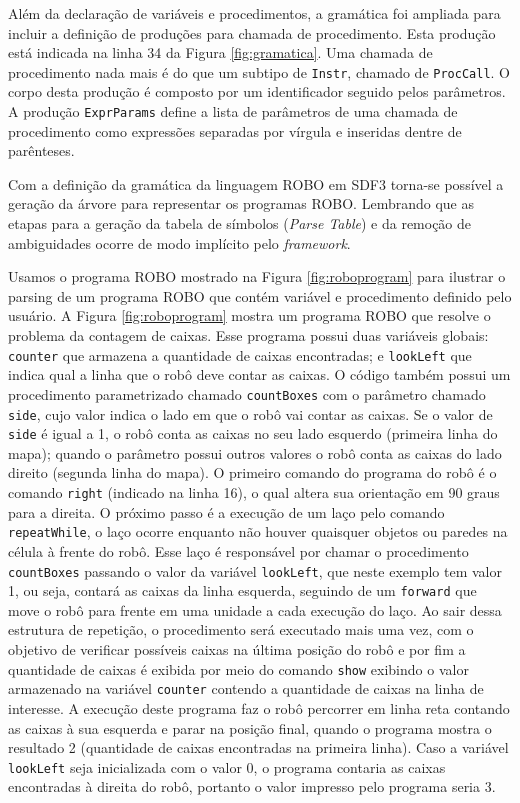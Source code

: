 Além da declaração de variáveis e procedimentos, a gramática foi ampliada para incluir a definição de produções para chamada de procedimento. Esta produção está indicada na linha 34 da Figura \ref{fig:gramatica}. Uma chamada de procedimento nada mais é do que um subtipo de \texttt{Instr}, chamado de \texttt{ProcCall}. O corpo desta produção é composto por um identificador seguido pelos parâmetros. A produção \texttt{ExprParams} define a lista de parâmetros de uma chamada de procedimento como expressões separadas por vírgula e inseridas dentre de parênteses.

Com a definição da gramática da linguagem ROBO em SDF3 torna-se possível a geração da árvore para representar os programas ROBO. Lembrando que as etapas para a geração da tabela de símbolos (\textit{Parse Table}) e da remoção de ambiguidades ocorre de modo implícito pelo \textit{framework}.

Usamos o programa ROBO mostrado na Figura \ref{fig:roboprogram} para ilustrar o parsing de um programa ROBO que contém variável e procedimento definido pelo usuário. A Figura \ref{fig:roboprogram} mostra um programa ROBO que resolve o problema da contagem de caixas. 
Esse programa possui duas variáveis globais: \texttt{counter} que armazena a quantidade de caixas encontradas; e \texttt{lookLeft} que indica qual a linha que o robô deve contar as caixas. O código também possui um procedimento parametrizado chamado \texttt{countBoxes} com o parâmetro chamado \texttt{side}, cujo valor indica o lado em que o robô vai contar as caixas. Se o valor de \texttt{side} é igual a 1, o robô conta as caixas no seu lado esquerdo (primeira linha do mapa);  quando o parâmetro possui outros valores o robô conta as caixas do lado direito (segunda linha do mapa). O primeiro comando do programa do robô é o comando \texttt{right} (indicado na linha 16), o qual altera sua orientação em 90 graus para a direita. O próximo passo é a execução de um laço pelo comando \texttt{repeatWhile}, o laço ocorre enquanto não houver quaisquer objetos ou paredes na célula à frente do robô. Esse laço é responsável por chamar o procedimento \texttt{countBoxes} passando o valor da variável \texttt{lookLeft}, que neste exemplo tem valor 1, ou seja, contará as caixas da linha esquerda, seguindo de um \texttt{forward} que move o robô para frente em uma unidade a cada execução do laço. Ao sair dessa estrutura de repetição, o procedimento será executado mais uma vez, com o objetivo de verificar possíveis caixas na última posição do robô e por fim a quantidade de caixas é exibida por meio do comando \texttt{show} exibindo o valor armazenado na variável \texttt{counter} contendo a quantidade de caixas na linha de interesse. 
A execução deste programa faz o robô percorrer em linha reta contando as caixas à sua esquerda e parar na posição final, quando o programa mostra o resultado 2 (quantidade de caixas encontradas na primeira linha). Caso a variável \texttt{lookLeft} seja inicializada com o valor 0, o programa contaria as caixas encontradas à direita do robô, portanto o valor impresso pelo programa seria 3. 

